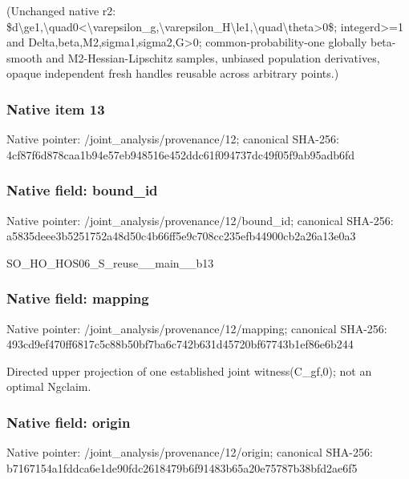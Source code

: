 \documentclass[10pt,a4paper]{article}
\begin{document}
\begingroup\raggedright\sloppy (Unchanged native r2:\allowbreak{} \$d\textbackslash{}ge1,\allowbreak{}\textbackslash{}quad0<\textbackslash{}varepsilon\_\allowbreak{}g,\allowbreak{}\textbackslash{}varepsilon\_\allowbreak{}H\textbackslash{}le1,\allowbreak{}\textbackslash{}quad\textbackslash{}theta>0\$;\allowbreak{} integerd>=\allowbreak{}1 and Delta,\allowbreak{}beta,\allowbreak{}M2,\allowbreak{}sigma1,\allowbreak{}sigma2,\allowbreak{}G>0;\allowbreak{} common-probability-one globally beta-smooth and M2-Hessian-Lipschitz samples,\allowbreak{} unbiased population derivatives,\allowbreak{} opaque independent fresh handles reusable across arbitrary points.)\par\endgroup

\subsubsection{Native item 13}
Native pointer: /joint\_\allowbreak{}analysis/provenance/12; canonical SHA-256: 4cf87f6d878caa1b94e57eb948516e452ddc61f094737dc49f05f9ab95adb6fd

\subsubsection{Native field: bound\_\allowbreak{}id}
Native pointer: /joint\_\allowbreak{}analysis/provenance/12/bound\_\allowbreak{}id; canonical SHA-256: a5835deee3b5251752a48d50c4b66ff5e9c708cc235efb44900cb2a26a13e0a3

\begingroup\raggedright\sloppy SO\_\allowbreak{}HO\_\allowbreak{}HOS06\_\allowbreak{}S\_\allowbreak{}reuse\_\allowbreak{}\_\allowbreak{}main\_\allowbreak{}\_\allowbreak{}b13\par\endgroup

\subsubsection{Native field: mapping}
Native pointer: /joint\_\allowbreak{}analysis/provenance/12/mapping; canonical SHA-256: 493cd9ef470ff6817c5c88b50bf7ba6c742b631d45720bf67743b1ef86e6b244

\begingroup\raggedright\sloppy Directed upper projection of one established joint witness(C\_\allowbreak{}gf,\allowbreak{}0);\allowbreak{} not an optimal Ngclaim.\par\endgroup

\subsubsection{Native field: origin}
Native pointer: /joint\_\allowbreak{}analysis/provenance/12/origin; canonical SHA-256: b7167154a1fddca6e1de90fdc2618479b6f91483b65a20e75787b38bfd2ae6f5
\end{document}
